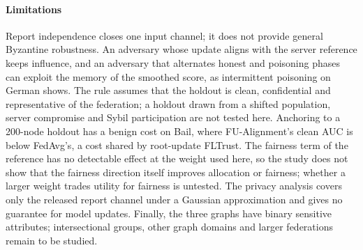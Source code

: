 \paragraph{Limitations}
Report independence closes one input channel; it does not provide general Byzantine robustness. An adversary whose update aligns with the server reference keeps influence, and an adversary that alternates honest and poisoning phases can exploit the memory of the smoothed score, as intermittent poisoning on German shows. The rule assumes that the holdout is clean, confidential and representative of the federation; a holdout drawn from a shifted population, server compromise and Sybil participation are not tested here. Anchoring to a 200-node holdout has a benign cost on Bail, where FU-Alignment's clean AUC is below FedAvg's, a cost shared by root-update FLTrust. The fairness term of the reference has no detectable effect at the weight used here, so the study does not show that the fairness direction itself improves allocation or fairness; whether a larger weight trades utility for fairness is untested. The privacy analysis covers only the released report channel under a Gaussian approximation and gives no guarantee for model updates. Finally, the three graphs have binary sensitive attributes; intersectional groups, other graph domains and larger federations remain to be studied.

